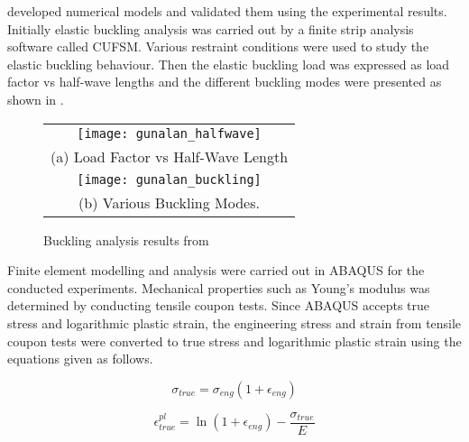  developed numerical models and validated them using the experimental results. Initially elastic buckling analysis was carried out by a finite strip analysis software called CUFSM. Various restraint conditions were used to study the elastic buckling behaviour. Then the elastic buckling load was expressed as load factor vs half-wave lengths and the different buckling modes were presented as shown in .
\begin{figure}[htbp]
	\centering
		\begin{tabular}{c}
			\texttt{[image: gunalan\_halfwave]} \\ 
			(a)	Load Factor vs Half-Wave Length\\ 
			\texttt{[image: gunalan\_buckling]} \\ 
			(b)	Various Buckling Modes. \\ 
		\end{tabular} 
		\caption{Buckling analysis results from \citet{Gunalan2013f}}
		\label{fig:gunalan_buckling}
\end{figure}

Finite element modelling and analysis were carried out in ABAQUS for the conducted experiments. Mechanical properties such as Young’s modulus was determined by conducting tensile coupon tests. Since ABAQUS accepts true stress and logarithmic plastic strain, the engineering stress and strain from tensile coupon tests were converted to true stress and logarithmic plastic strain using the equations given as follows.

\begin{equation}
\sigma_{true} = \sigma_{eng}(1+\epsilon_{eng})
\end{equation}

\begin{equation}
\epsilon_{true}^{pl} = \ln(1+\epsilon_{eng})-\dfrac{\sigma_{true}}{E}
\end{equation}


